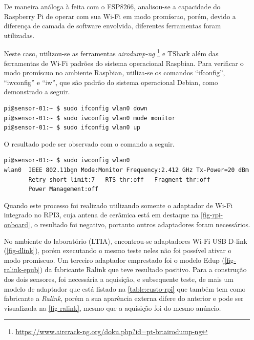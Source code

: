 De maneira análoga à feita com o ESP8266, analisou-se a capacidade do Raspberry Pi
de operar com sua Wi-Fi em modo promíscuo, porém, devido a diferença de camada
de software envolvida, diferentes ferramentas foram utilizadas.

Neste caso, utilizou-se as ferramentas \emph{airodump-ng} \footnote{\url{https://www.aircrack-ng.org/doku.php?id=pt-br:airodump-ng}}
e TShark além das ferramentas de
Wi-Fi padrões do sistema operacional Raspbian. Para verificar o modo
promíscuo no ambiente Raspbian, utiliza-se os comandos ``ifconfig'',
``iwconfig'' e ``iw'', que são padrão do sistema operacional Debian, como
demonstrado a seguir.

\begin{lstlisting}[language=bash,caption={Ativação do modo monitor},label=code-iw-monitor]
pi@sensor-01:~ $ sudo ifconfig wlan0 down
pi@sensor-01:~ $ sudo iwconfig wlan0 mode monitor
pi@sensor-01:~ $ sudo ifconfig wlan0 up
\end{lstlisting}

O resultado pode ser observado com o comando a seguir.

\begin{lstlisting}[language=bash,caption={``iwconfig'' com modo monitor},label=code-check-monitor]
pi@sensor-01:~ $ sudo iwconfig wlan0
wlan0  IEEE 802.11bgn Mode:Monitor Frequency:2.412 GHz Tx-Power=20 dBm
	   Retry short limit:7   RTS thr:off   Fragment thr:off
       Power Management:off
\end{lstlisting}

Quando este processo foi realizado utilizando somente o adaptador de Wi-Fi
integrado no RPI3, cuja antena de cerâmica está em destaque na
\autoref{fig-rpi-onboard}, o resultado foi negativo, portanto outros adaptadores
foram necessários.

No ambiente do laboratório (LTIA),
encontrou-se adaptadores Wi-Fi USB D-link
(\autoref{fig-dlink}), porém executando o mesmo teste neles não foi possível
ativar o modo promíscuo. Um terceiro adaptador emprestado foi o modelo Edup (\autoref{fig-ralink-epub}) da
fabricante Ralink que teve resultado
positivo. Para a construção dos dois sensores, foi necessária a aquisição, e
subsequente teste, de mais um modelo de adaptador que está listado na
\autoref{table:custo-rpi} que também tem como fabricante a \emph{Ralink}, porém a sua
aparência externa difere do anterior e pode ser visualizada na
\autoref{fig-ralink}, mesmo que a aquisição foi do mesmo anúncio.

